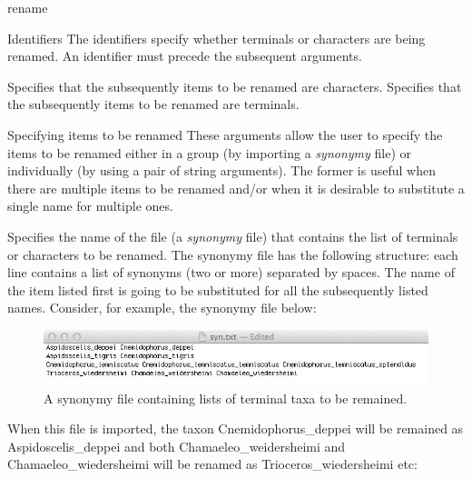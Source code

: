 \begin{command}{rename}{}
    \begin{arguments}
		\begin{argumentgroup}{Identifiers}
		{The identifiers specify whether terminals or characters are being
        renamed. An identifier must precede the subsequent arguments.}
		
            {Specifies that the subsequently items to be renamed are characters.} 
            {}
            {Specifies that the subsequently items to be renamed are terminals.} 
            {}
	\end{argumentgroup}
	      
	  \begin{argumentgroup}{Specifying items to be renamed}
	      {These arguments allow the user to specify the items to be renamed either in a group 
	      (by importing a \emph{synonymy} file) or individually (by using a pair of string arguments).
	      The former is useful when there are multiple items to be renamed and/or when it is
	      desirable to substitute a single name for  multiple ones.}
    
                {Specifies the name of the file (a \emph{synonymy} file) that contains the list of
                terminals or characters to be renamed. The synonymy file has the following structure:
                each line contains a list of synonyms (two or more) separated by spaces. The name of the
                item listed first is going to be substituted for all the subsequently listed names. Consider,
                for example, the synonymy file below:

    \begin{figure}[th!]
    \begin{center}
        \includegraphics[width=1.0\textwidth]{doc/figures/syn.jpg}
    \end{center}
    \caption{A synonymy file containing lists of terminal taxa to be remained.}
    \label{fig:syn}
\end{figure}
                 
                 When this file is imported, the taxon
                 Cnemidophorus\_deppei will be remained as Aspidoscelis\_deppei  and both Chamaeleo\_weidersheimi 
                 and Chamaeleo\_wiedersheimi will be renamed as Trioceros\_wiedersheimi etc:}
                {}
    

\end{argumentgroup}
\end{arguments}
\end{command}
